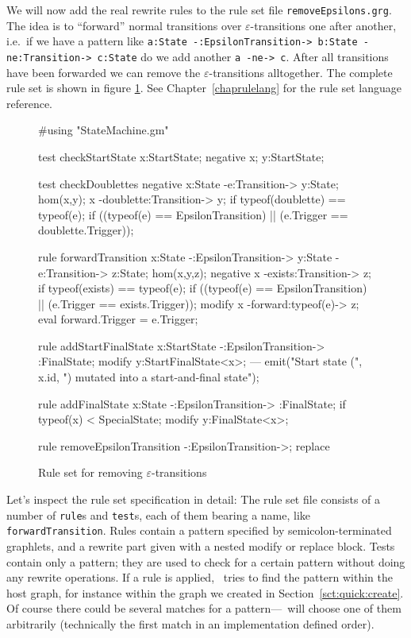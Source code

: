 We will now add the real rewrite rules to the rule set file \texttt{removeEpsilons.grg}.
The idea is to ``forward'' normal transitions over $\varepsilon$-transitions one after another, i.e.\ if we have a pattern like \texttt{a:State -:EpsilonTransition-> b:State -ne:Transition-> c:State} do we add another \texttt{a -ne-> c}.
After all transitions have been forwarded we can remove the $\varepsilon$-transitions alltogether.
The complete rule set is shown in figure \ref{fig:quick:ruleset}.
See Chapter~\ref{chaprulelang} for the rule set language reference.

\begin{figure}[htbp]
	\centering
	\begin{grgen}
#using "StateMachine.gm"

test checkStartState {
    x:StartState;
    negative {
        x;
        y:StartState;
    }
}

test checkDoublettes {
    negative {
        x:State -e:Transition-> y:State;
        hom(x,y);
        x -doublette:Transition-> y;
        if {typeof(doublette) == typeof(e);}
        if { ((typeof(e) == EpsilonTransition) || (e.Trigger == doublette.Trigger)); }
    }
}

rule forwardTransition {
    x:State -:EpsilonTransition-> y:State -e:Transition-> z:State;
    hom(x,y,z);
    negative {
        x -exists:Transition-> z;
        if {typeof(exists) == typeof(e);}
        if { ((typeof(e) == EpsilonTransition) || (e.Trigger == exists.Trigger)); }
    }
    modify {
        x -forward:typeof(e)-> z;
        eval {forward.Trigger = e.Trigger;}
    }
}

rule addStartFinalState {
    x:StartState -:EpsilonTransition-> :FinalState;
    modify {
        y:StartFinalState<x>;
    ---
        emit("Start state (", x.id, ") mutated into a start-and-final state");
    }
}

rule addFinalState {
    x:State -:EpsilonTransition-> :FinalState;
    if {typeof(x) < SpecialState;}
    modify {
        y:FinalState<x>;
    }
}

rule removeEpsilonTransition {
    -:EpsilonTransition->;
    replace {}
}
	\end{grgen}
	\caption{Rule set for removing $\varepsilon$-transitions}
	\label{fig:quick:ruleset}
\end{figure}

Let's inspect the rule set specification in detail: The rule set file consists of a number of \texttt{rule}s and \texttt{test}s, each of them bearing a name, like \texttt{forwardTransition}.
Rules contain a pattern specified by semicolon-terminated graphlets, and a rewrite part given with a nested modify or replace block.
Tests contain only a pattern; they are used to check for a certain pattern without doing any rewrite operations.
If a rule is applied, \GrG\ tries to find the pattern within the host graph, for instance within the graph we created in Section~\ref{sct:quick:create}.
Of course there could be several matches for a pattern---\GrG\ will choose one of them arbitrarily (technically the first match in an implementation defined order).

